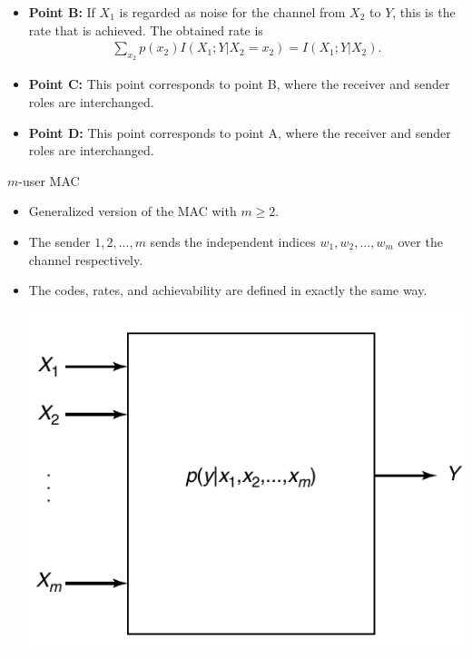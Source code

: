 \documentclass{beamer}
\newcommand{\blue}[1]{{\color{blue} #1}}
\begin{document}
{\begin{frame}
\begin{itemize}
\item<2-> \blue{\textbf{Point B:}} If $X_1$ is regarded as noise for the channel from $X_2$ to $Y$, this is the rate that is achieved. The obtained rate is
    \begin{eqnarray*}
        \sum_{x_2} p(x_2)I(X_1;Y|X_2 = x_2) = I(X_1;Y|X_2).
    \end{eqnarray*}

\item<3-> \blue{\textbf{Point C:}} This point corresponds to point B, where the receiver and sender roles are interchanged.

\item<4-> \blue{\textbf{Point D:}} This point corresponds to point A, where the receiver and sender roles are interchanged.
    \end{itemize}

\end{frame}
\begin{frame}{$m$-user MAC}
%
 \begin{itemize}
	\justifying

\item<1-> Generalized version of the MAC with $m \geq 2$.

\item<2-> The sender $1,2,...,m$ sends the independent indices $w_1,w_2,...,w_m$ over the channel respectively. 

\item<3-> The codes, rates, and achievability are defined in exactly the same way.
\begin{center}
    \includegraphics[scale = 0.25]{Diagrams/M-user MAC.png}
\end{center}
    \end{itemize}


\end{frame}}
\end{document}
